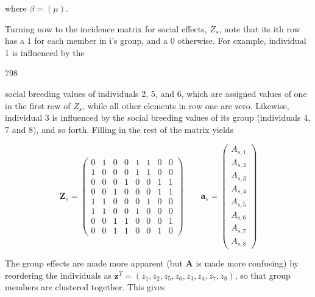 \documentclass{article}
\begin{document}
where  $ \beta = (\mu) $.

Turning now to the incidence matrix for social effects,  $ Z_{s} $, note that its ith row has a 1 for each member in i's group, and a 0 otherwise. For example, individual 1 is influenced by the

798

social breeding values of individuals 2, 5, and 6, which are assigned values of one in the first row of  $ Z_{s} $, while all other elements in row one are zero. Likewise, individual 3 is influenced by the social breeding values of its group (individuals 4, 7 and 8), and so forth. Filling in the rest of the matrix yields

\begin{equation}
\mathbf{Z}_{s}=\begin{pmatrix}{{{0}}}&{{{1}}}&{{{0}}}&{{{0}}}&{{{1}}}&{{{1}}}&{{{0}}}&{{{0}}} \\{{{1}}}&{{{0}}}&{{{0}}}&{{{0}}}&{{{1}}}&{{{1}}}&{{{0}}}&{{{0}}} \\{{{0}}}&{{{0}}}&{{{0}}}&{{{1}}}&{{{0}}}&{{{0}}}&{{{1}}}&{{{1}}} \\{{{0}}}&{{{0}}}&{{{1}}}&{{{0}}}&{{{0}}}&{{{0}}}&{{{1}}}&{{{1}}} \\{{{1}}}&{{{1}}}&{{{0}}}&{{{0}}}&{{{0}}}&{{{1}}}&{{{0}}}&{{{0}}} \\{{{1}}}&{{{1}}}&{{{0}}}&{{{0}}}&{{{1}}}&{{{0}}}&{{{0}}}&{{{0}}} \\{{{0}}}&{{{0}}}&{{{1}}}&{{{1}}}&{{{0}}}&{{{0}}}&{{{0}}}&{{{1}}} \\{{{0}}}&{{{0}}}&{{{1}}}&{{{1}}}&{{{0}}}&{{{0}}}&{{{1}}}&{{{0}}}\end{pmatrix}\qquad\mathbf{a}_{s}=\begin{pmatrix}{{{A_{s,1}}}} \\{{{A_{s,2}}}} \\{{{A_{s,3}}}} \\{{{A_{s,4}}}} \\{{{A_{s,5}}}} \\{{{A_{s,6}}}} \\{{{A_{s,7}}}} \\{{{A_{s,8}}}}\end{pmatrix}
\end{equation}

The group effects are made more apparent (but  $ \mathbf{A} $ is made more confusing) by reordering the individuals as  $ \mathbf{z}^T = (z_1, z_2, z_5, z_6, z_3, z_4, z_7, z_8) $, so that group members are clustered together. This gives
\end{document}
